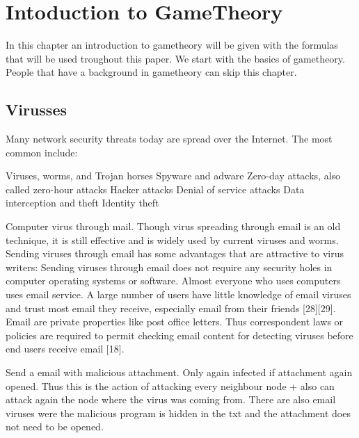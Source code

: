 \chapter{Intoduction to GameTheory}
\label{cha:1}
%

In this chapter an introduction to gametheory will be given with the formulas that will be used troughout this paper. We start with the basics of gametheory. People that have a background in gametheory can skip this chapter.


\section{Virusses}

Many network security threats today are spread over the Internet. The most common include:

Viruses, worms, and Trojan horses
Spyware and adware
Zero-day attacks, also called zero-hour attacks
Hacker attacks
Denial of service attacks
Data interception and theft
Identity theft


Computer virus through mail. 
Though virus spreading through email is an old technique, it is still effective and is widely used by
current viruses and worms. Sending viruses through email has some advantages that are attractive to
virus writers:
 Sending viruses through email does not require any security holes in computer operating systems
or software.
 Almost everyone who uses computers uses email service.
 A large number of users have little knowledge of email viruses and trust most email they receive,
especially email from their friends [28][29].
 Email are private properties like post office letters. Thus correspondent laws or policies are required
to permit checking email content for detecting viruses before end users receive email [18].

Send a email with malicious attachment. Only again infected if attachment again opened. Thus this is the action of attacking every neighbour node + also can attack again the node where the virus was coming from.
There are also email viruses were the malicious program is hidden in the txt and the attachment does not need to be opened. 

